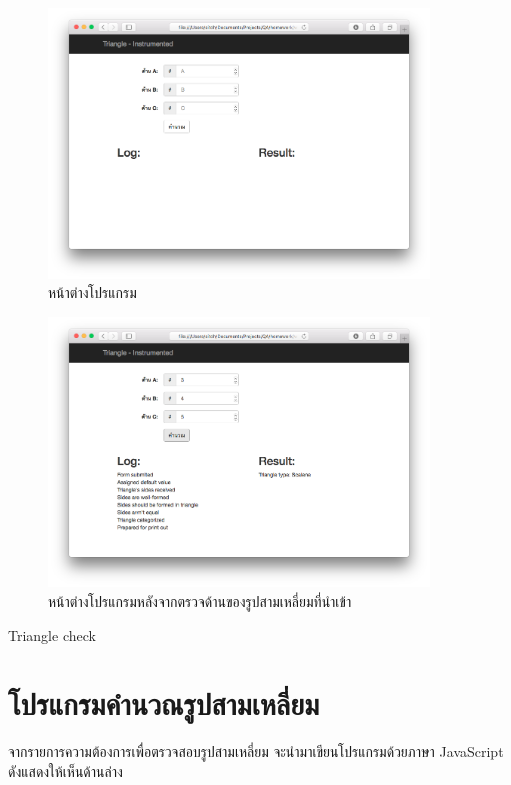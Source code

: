 \documentclass[12pt,a4paper]{article}
\begin{document}
   \begin{figure}[ht!]
       \centering
       \includegraphics[width=0.9\textwidth]{img/application.png}
       \caption{หน้าต่างโปรแกรม\label{fig:application}}
   \end{figure}

   \begin{figure}[ht!]
       \centering
       \includegraphics[width=0.9\textwidth]{img/instrumented.png}
       \caption{หน้าต่างโปรแกรมหลังจากตรวจด้านของรูปสามเหลี่ยมที่นำเข้า\label{fig:instrumented}}
   \end{figure}

Triangle check
\newpage
\clearpage
\section[โปรแกรมคำนวณรูปสามเหลี่ยม]{โปรแกรมคำนวณรูปสามเหลี่ยม}
\label{sec:trianglecal}
จากรายการความต้องการเพื่อตรวจสอบรูปสามเหลี่ยม จะนำมาเขียนโปรแกรมด้วยภาษา JavaScript ดังแสดงให้เห็นด้านล่าง

\end{document}
